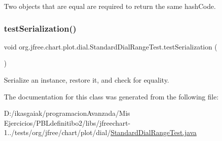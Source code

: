 Two objects that are equal are required to return the same hash\+Code. \mbox{\label{classorg_1_1jfree_1_1chart_1_1plot_1_1dial_1_1_standard_dial_range_test_a6b9b9670d5caed1ff52a0a462d323596}} 
\subsubsection{\texorpdfstring{test\+Serialization()}{testSerialization()}}
{\footnotesize\ttfamily void org.\+jfree.\+chart.\+plot.\+dial.\+Standard\+Dial\+Range\+Test.\+test\+Serialization (\begin{DoxyParamCaption}{ }\end{DoxyParamCaption})}

Serialize an instance, restore it, and check for equality. 

The documentation for this class was generated from the following file\+:\begin{DoxyCompactItemize}
\item 
D\+:/ikasgaiak/programacion\+Avanzada/\+Mis Ejercicios/\+P\+B\+Ldefinitibo2/libs/jfreechart-\/1../tests/org/jfree/chart/plot/dial/\mbox{\hyperlink{_standard_dial_range_test_8java}{Standard\+Dial\+Range\+Test.\+java}}\end{DoxyCompactItemize}
